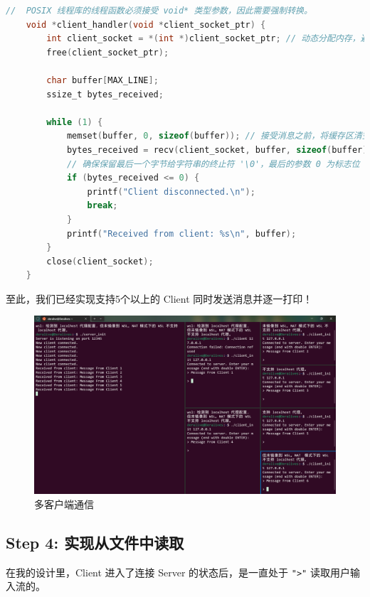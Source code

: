 \documentclass[14pt,a4paper,UTF8,twoside]{article}
\begin{document}
\begin{lstlisting}[language=C, title={Thread Handler}]
    //  POSIX 线程库的线程函数必须接受 void* 类型参数，因此需要强制转换。
    void *client_handler(void *client_socket_ptr) {
        int client_socket = *(int *)client_socket_ptr; // 动态分配内存，避免 client_socket 被覆盖
        free(client_socket_ptr);
    
        char buffer[MAX_LINE];
        ssize_t bytes_received;
    
        while (1) {
            memset(buffer, 0, sizeof(buffer)); // 接受消息之前，将缓存区清空，防止信息混乱
            bytes_received = recv(client_socket, buffer, sizeof(buffer) - 1, 0);
            // 确保保留最后一个字节给字符串的终止符 '\0'，最后的参数 0 为标志位
            if (bytes_received <= 0) {
                printf("Client disconnected.\n");
                break;
            }
            printf("Received from client: %s\n", buffer);
        }
        close(client_socket);
    }
\end{lstlisting}

\begin{rmr}
至此，我们已经实现支持5个以上的 Client 同时发送消息并逐一打印！
\end{rmr}

\begin{figure}[H]
    \centering
    \includegraphics[width=0.9\linewidth]{lab7/multiclient.png}
    \caption{多客户端通信}
    \label{fig:multiclient}
\end{figure}

\subsection{Step 4: 实现从文件中读取}

在我的设计里，Client 进入了连接 Server 的状态后，是一直处于 \texttt{">"} 读取用户输入流的。
\end{document}
